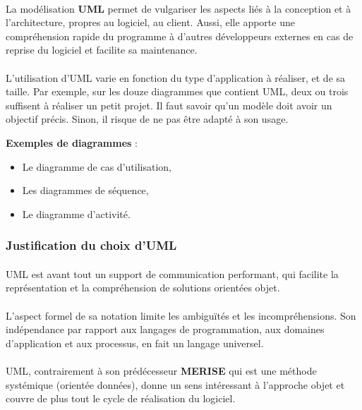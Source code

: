 \paragraph{}
La modélisation \textbf{UML} permet de vulgariser les aspects liés à la conception et à l’architecture, propres au logiciel, au client. Aussi, elle apporte une compréhension rapide du programme à d’autres développeurs externes en cas de reprise du logiciel et facilite sa maintenance.
\paragraph{}
L’utilisation d’UML varie en fonction du type d’application à réaliser, et de sa taille. Par exemple, sur les douze diagrammes que contient UML, deux ou trois suffisent à réaliser un petit projet. Il faut savoir qu’un modèle doit avoir un objectif précis. Sinon, il risque de ne pas être adapté à son usage.

\textbf{Exemples de diagrammes} :
\begin{itemize}
    \item Le diagramme de cas d’utilisation,
    \item Les diagrammes de séquence,
    \item Le diagramme d'activité.
\end{itemize}
\subsubsection*{Justification du choix d’UML}
\paragraph{}
UML est avant tout un support de communication performant, qui facilite la représentation et la compréhension de solutions orientées objet.
\paragraph{}
L'aspect formel de sa notation limite les ambiguïtés et les incompréhensions. Son indépendance par rapport aux langages de programmation, aux domaines d'application et aux processus, en fait un langage universel.
\paragraph{}
UML, contrairement à son prédécesseur \textbf{MERISE} qui est une méthode systémique (orientée données), donne un sens intéressant à l'approche objet et couvre de plus tout le cycle de réalisation du logiciel.

